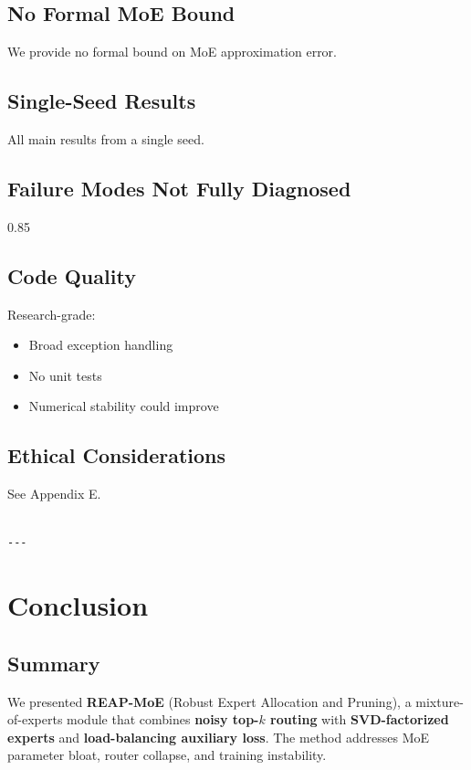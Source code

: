 \subsection{No Formal MoE Bound}

We provide no formal bound on MoE approximation error.

\subsection{Single-Seed Results}

All main results from a single seed.

\subsection{Failure Modes Not Fully Diagnosed}

0.85

\subsection{Code Quality}

Research-grade:
\begin{itemize}
\item Broad exception handling
\item No unit tests
\item Numerical stability could improve

\end{itemize}
\subsection{Ethical Considerations}

See Appendix E.
\begin{lstlisting}

---
\end{lstlisting}

\section{Conclusion}

\subsection{Summary}

We presented \textbf{REAP-MoE} (Robust Expert Allocation and Pruning), a 
mixture-of-experts module that combines \textbf{noisy top-$k$ routing} with 
\textbf{SVD-factorized experts} and \textbf{load-balancing auxiliary loss}. The method 
addresses MoE parameter bloat, router collapse, and training instability.

